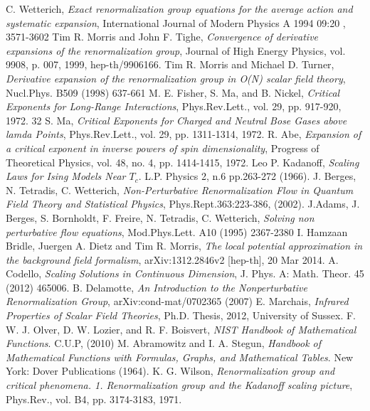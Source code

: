 \begin{thebibliography}{10}
C. Wetterich, \emph{Exact renormalization group equations for the average action and systematic expansion}, International Journal of Modern Physics A 1994 09:20 , 3571-3602 
Tim R. Morris and John F. Tighe, \emph{Convergence of derivative expansions of the renormalization group}, Journal of High Energy Physics, vol. 9908, p. 007, 1999, hep-th/9906166.
Tim R. Morris and Michael D. Turner, \emph{Derivative expansion of the renormalization group in O(N) scalar field theory},  	Nucl.Phys. B509 (1998) 637-661
M. E. Fisher, S. Ma, and B. Nickel, \emph{Critical Exponents for Long-Range Interactions}, Phys.Rev.Lett., vol. 29, pp. 917-920, 1972. 32
S. Ma, \emph{Critical Exponents for Charged and Neutral Bose Gases above lamda Points}, Phys.Rev.Lett., vol. 29, pp. 1311-1314, 1972.
R. Abe, \emph{Expansion of a critical exponent in inverse powers of spin dimensionality}, Progress of Theoretical Physics, vol. 48, no. 4, pp. 1414-1415, 1972.
Leo P. Kadanoff, \emph{Scaling Laws for Ising Models Near $T_c$}. L.P. Physics 2, n.6 pp.263-272 (1966).
J. Berges, N. Tetradis, C. Wetterich, \emph{Non-Perturbative Renormalization Flow in Quantum Field Theory and Statistical Physics},  	Phys.Rept.363:223-386, (2002).
J.Adams, J. Berges, S. Bornholdt, F. Freire, N. Tetradis, C. Wetterich, \emph{Solving non perturbative flow equations}, Mod.Phys.Lett. A10 (1995) 2367-2380
I. Hamzaan Bridle, Juergen A. Dietz and Tim R. Morris, \emph{The local potential approximation in the background field formalism}, arXiv:1312.2846v2 [hep-th], 20 Mar 2014.
A. Codello, \emph{Scaling Solutions in Continuous Dimension}, J. Phys. A: Math. Theor. 45 (2012) 465006.
B. Delamotte, \emph{An Introduction to the Nonperturbative Renormalization Group}, arXiv:cond-mat/0702365 (2007)
E. Marchais, \emph{Infrared Properties of Scalar Field Theories}, Ph.D. Thesis, 2012, University of Sussex.
F. W. J. Olver, D. W. Lozier, and R. F. Boisvert, \emph{NIST Handbook of Mathematical Functions}. C.U.P, (2010)
M. Abramowitz and I. A. Stegun, \emph{Handbook of Mathematical Functions with Formulas, Graphs, and Mathematical Tables}. New York: Dover Publications (1964).
K. G. Wilson, \emph{Renormalization group and critical phenomena. 1. Renormalization group and the Kadanoff scaling picture}, Phys.Rev., vol. B4, pp. 3174-3183, 1971.

\end{thebibliography}
